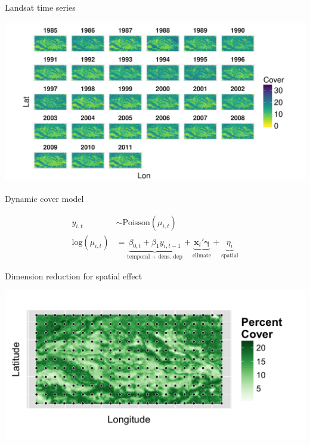\documentclass[12pt, compress, aspectratio=1610]{beamer}
\begin{document}
\begin{frame}{%
\protect\hypertarget{landsat-time-series}{%
Landsat time series}}

\includegraphics[height=2.8in]{./figures/all_years_percCover.pdf}

\end{frame}

\begin{frame}{%
\protect\hypertarget{dynamic-cover-model}{%
Dynamic cover model}}

\begin{align*}
y_{i,t} &\sim \text{Poisson}(\mu_{i,t}) \\
\text{log}(\mu_{i,t}) &= \underbrace{\beta_{0,t} + \beta_{1}y_{i,t-1}}_\text{temporal + dens. dep} + \underbrace{\textbf{x}_{t}'\boldsymbol{\gamma}}_\text{climate} + \underbrace{\eta_{i}}_\text{spatial}
\end{align*}

\end{frame}

\begin{frame}{%
\protect\hypertarget{dimension-reduction-for-spatial-effect}{%
Dimension reduction for spatial effect}}

\includegraphics[width=\textwidth]{./figures/SAGE_Grid_wKnots_subset.png}

\end{frame}
\end{document}
